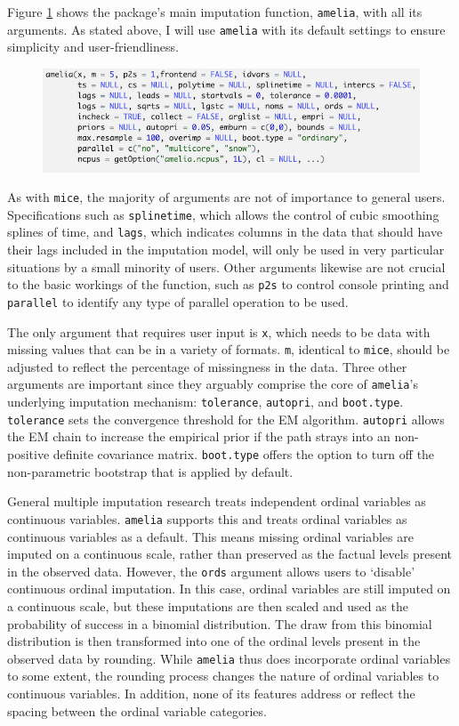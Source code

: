 \documentclass[12pt,econ]{sources/authesis}
\makeatletter
\def\maxwidth{\ifdim\Gin@nat@width>\linewidth\linewidth
\else\Gin@nat@width\fi}
\let\Oldincludegraphics\includegraphics
\renewcommand{\includegraphics}[1]{\Oldincludegraphics[width=\maxwidth]{#1}}
\def\caption{\refstepcounter\@captype \@dblarg{\@caption\@captype}}
\makeatother
\begin{document}
Figure \ref{amelia-func} shows the package's main imputation function, \texttt{amelia}, with all its arguments. As stated above, I will use \texttt{amelia} with its default settings to ensure simplicity and user-friendliness.
\begin{figure}[hbt]
  \centering
  \includegraphics{figures/amelia.png}
  \caption{The \texttt{amelia} function}
  \label{amelia-func}
\end{figure}
As with \texttt{mice}, the majority of arguments are not of importance to general users. Specifications such as \texttt{splinetime}, which allows the control of cubic smoothing splines of time, and \texttt{lags}, which indicates columns in the data that should have their lags included in the imputation model, will only be used in very particular situations by a small minority of users. Other arguments likewise are not crucial to the basic workings of the function, such as \texttt{p2s} to control console printing and \texttt{parallel} to identify any type of parallel operation to be used.

The only argument that requires user input is \texttt{x}, which needs to be data with missing values that can be in a variety of formats. \texttt{m}, identical to \texttt{mice}, should be adjusted to reflect the percentage of missingness in the data. Three other arguments are important since they arguably comprise the core of \texttt{amelia}'s underlying imputation mechanism: \texttt{tolerance}, \texttt{autopri}, and \texttt{boot.type}. \texttt{tolerance} sets the convergence threshold for the EM algorithm. \texttt{autopri} allows the EM chain to increase the empirical prior if the path strays into an non-positive definite covariance matrix. \texttt{boot.type} offers the option to turn off the non-parametric bootstrap that is applied by default.

General multiple imputation research treats independent ordinal variables as continuous variables. \texttt{amelia} supports this and treats ordinal variables as continuous variables as a default. This means missing ordinal variables are imputed on a continuous scale, rather than preserved as the factual levels present in the observed data. However, the \texttt{ords} argument allows users to `disable' continuous ordinal imputation. In this case, ordinal variables are still imputed on a continuous scale, but these imputations are then scaled and used as the probability of success in a binomial distribution. The draw from this binomial distribution is then transformed into one of the ordinal levels present in the observed data by rounding. While \texttt{amelia} thus does incorporate ordinal variables to some extent, the rounding process changes the nature of ordinal variables to continuous variables. In addition, none of its features address or reflect the spacing between the ordinal variable categories.
\end{document}
